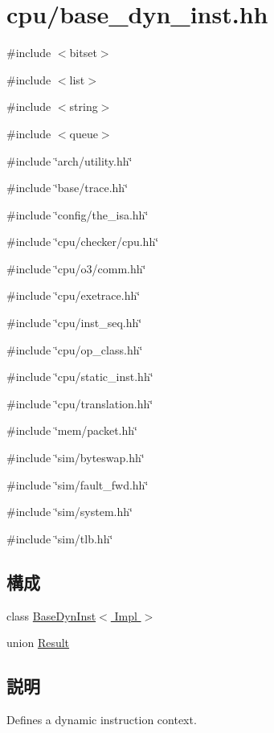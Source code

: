 \hypertarget{base__dyn__inst_8hh}{
\section{cpu/base\_\-dyn\_\-inst.hh}
\label{base__dyn__inst_8hh}
}
{\ttfamily \#include $<$bitset$>$}\par
{\ttfamily \#include $<$list$>$}\par
{\ttfamily \#include $<$string$>$}\par
{\ttfamily \#include $<$queue$>$}\par
{\ttfamily \#include \char`\"{}arch/utility.hh\char`\"{}}\par
{\ttfamily \#include \char`\"{}base/trace.hh\char`\"{}}\par
{\ttfamily \#include \char`\"{}config/the\_\-isa.hh\char`\"{}}\par
{\ttfamily \#include \char`\"{}cpu/checker/cpu.hh\char`\"{}}\par
{\ttfamily \#include \char`\"{}cpu/o3/comm.hh\char`\"{}}\par
{\ttfamily \#include \char`\"{}cpu/exetrace.hh\char`\"{}}\par
{\ttfamily \#include \char`\"{}cpu/inst\_\-seq.hh\char`\"{}}\par
{\ttfamily \#include \char`\"{}cpu/op\_\-class.hh\char`\"{}}\par
{\ttfamily \#include \char`\"{}cpu/static\_\-inst.hh\char`\"{}}\par
{\ttfamily \#include \char`\"{}cpu/translation.hh\char`\"{}}\par
{\ttfamily \#include \char`\"{}mem/packet.hh\char`\"{}}\par
{\ttfamily \#include \char`\"{}sim/byteswap.hh\char`\"{}}\par
{\ttfamily \#include \char`\"{}sim/fault\_\-fwd.hh\char`\"{}}\par
{\ttfamily \#include \char`\"{}sim/system.hh\char`\"{}}\par
{\ttfamily \#include \char`\"{}sim/tlb.hh\char`\"{}}\par
\subsection*{構成}
\begin{DoxyCompactItemize}
\item 
class \hyperlink{classBaseDynInst}{BaseDynInst$<$ Impl $>$}
\item 
union \hyperlink{unionBaseDynInst_1_1Result}{Result}
\end{DoxyCompactItemize}


\subsection{説明}
Defines a dynamic instruction context. 